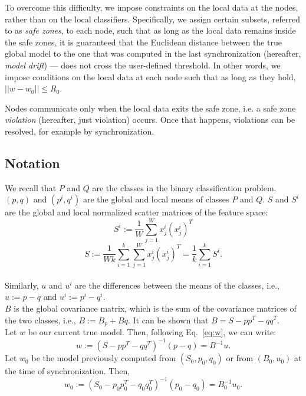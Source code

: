 \par To overcome this difficulty, we impose constraints on the local data at the nodes, rather than on the 
local classifiers. Specifically, we assign certain subsets, referred to as \textit{safe zones}, to each node,
such that as long as the local data remains inside the safe zones, it is guaranteed that the Euclidean distance between the true global model to the one that was computed in the last synchronization (hereafter, \emph{model drift}) --- does not cross the user-defined threshold.
In other words, we  impose conditions on the local
data at each node such that as long as they hold, $||w-w_0|| \leq R_0$.

Nodes communicate only when the local data exits the
safe zone, i.e.  a safe zone \textit{violation} (hereafter, just
violation) occurs. Once that happens, violations can be resolved,
for example by synchronization.


\subsection{Notation}
\noindent
We recall that $P$ and $Q$ are the classes in the binary classification problem.
 $(p,q)$ and $(p^i,q^i)$  are the global and local means of classes $P$ and $Q$.
$S$ and $S^i$  are the global and local normalized scatter matrices of the feature space:
\begin{equation*}
S^i := \frac{1}{W}\sum_{j=1}^{W}x^i_j(x^i_j)^T
\end{equation*}
\begin{equation*}
S := \frac{1}{Wk}
\sum_{i=1}^k\sum_{j=1}^Wx^i_j(x^i_j)^T=\frac{1}{k}\sum_{i=1}^kS^i.
\end{equation*}
\\Similarly, $u$ and $u^i$ are the differences between the means of the classes, i.e., $u:=p - q$ and $u^i:=p^i - q^i$.
\\ $B$ is the global covariance matrix, which is the sum of the covariance matrices of the two classes, i.e., $B:=B_p+Bq$.
It can be shown that $B=S - pp^T - qq^T$.
\\Let $w$ be our current true model. Then, following Eq.~\ref{eq:w}, we can write:
\begin{equation}
w:=(S - pp^T - qq^T)^{-1}(p-q)=B^{-1}u.
\end{equation}
Let $w_0$ be the  model previously computed from $(S_0, p_0, q_0)$
or from $(B_0,u_0)$ at the time of synchronization.
Then,
\begin{equation}
w_0:=(S_0 - p_0p_0^T - q_0q_0^T)^{-1}(p_0-q_0)=B_0^{-1}u_0.
\end{equation}

